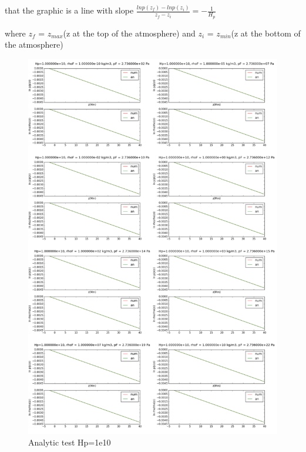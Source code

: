 \documentclass[10pt]{book}
\begin{document}
that the graphic is a line with slope $\frac{ln p(z_f) - ln  p(z_i)}{z_f - z_i} = -\frac{1}{H_p} $

where $z_f$ = $z_{max}$(z at the top of the atmosphere) and $z_i$ = $z_{min}$(z at the bottom of the atmosphere)


\begin{figure}[H]
 \centering
 \includegraphics[scale=0.5]{allanalytic.png}
 \caption{Analytic test Hp=1e10}
\end{figure}
\end{document}
